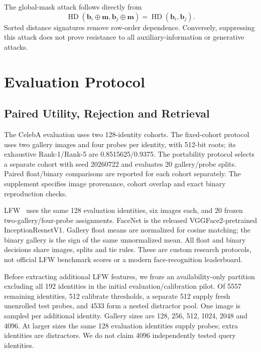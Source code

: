 \documentclass[journal]{IEEEtran}
\newcommand{\HD}{\operatorname{HD}}
\begin{document}
The global-mask attack follows directly from
\begin{equation}
\HD(\mathbf b_i\oplus\mathbf m,\mathbf b_j\oplus\mathbf m)
=\HD(\mathbf b_i,\mathbf b_j).
\end{equation}
Sorted distance signatures remove row-order dependence. Conversely, suppressing this attack does not prove resistance to all auxiliary-information or generative attacks.

\section{Evaluation Protocol}\label{sec:evaluation}
\subsection{Paired Utility, Rejection and Retrieval}\label{sec:utility_protocol}
The CelebA evaluation uses two 128-identity cohorts. The fixed-cohort protocol uses two gallery images and four probes per identity, with 512-bit roots; its exhaustive Rank-1/Rank-5 are 0.8515625/0.9375. The portability protocol selects a separate cohort with seed 20260722 and evaluates 20 gallery/probe splits. Paired float/binary comparisons are reported for each cohort separately. The supplement specifies image provenance, cohort overlap and exact binary reproduction checks.

LFW~\cite{huang2007lfw} uses the same 128 evaluation identities, six images each, and 20 frozen two-gallery/four-probe assignments. FaceNet is the released VGGFace2-pretrained InceptionResnetV1. Gallery float means are normalized for cosine matching; the binary gallery is the sign of the same unnormalized mean. All float and binary decisions share images, splits and tie rules. These are custom research protocols, not official LFW benchmark scores or a modern face-recognition leaderboard.

Before extracting additional LFW features, we froze an availability-only partition excluding all 192 identities in the initial evaluation/calibration pilot. Of 5557 remaining identities, 512 calibrate thresholds, a separate 512 supply fresh unenrolled test probes, and 4533 form a nested distractor pool. One image is sampled per additional identity. Gallery sizes are 128, 256, 512, 1024, 2048 and 4096. At larger sizes the same 128 evaluation identities supply probes; extra identities are distractors. We do not claim 4096 independently tested query identities.
\end{document}
